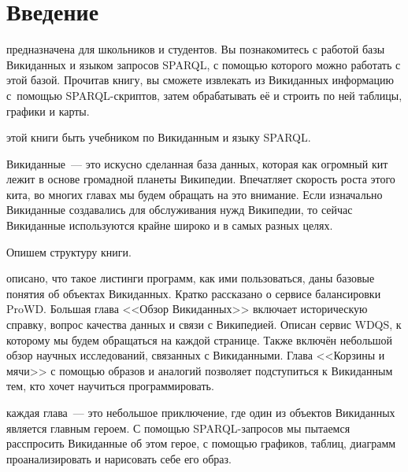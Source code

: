 \chapter*{Введение}
\label{ch:intro}

 предназначена для школьников и студентов. 
Вы познакомитесь с работой базы Викиданных и языком запросов SPARQL, 
с помощью которого можно работать с этой базой. 
Прочитав книгу, вы сможете извлекать из Викиданных информацию с~помощью SPARQL-скриптов, 
затем обрабатывать её и строить по ней таблицы, графики и карты.

 этой книги быть учебником по Викиданным и языку SPARQL.

\vspace{4mm}

Викиданные~--- это искусно сделанная база данных, которая как огромный кит лежит в основе громадной планеты Википедии. 
Впечатляет скорость роста этого кита, во многих главах мы будем обращать на это внимание.
Если изначально Викиданные создавались для обслуживания нужд Википедии, 
то сейчас Викиданные используются крайне широко и в самых разных целях.

\vspace{4mm}
Опишем структуру книги. 

 описано, 
что такое листинги программ, как ими пользоваться, даны базовые понятия об объектах Викиданных. 
Кратко рассказано о сервисе балансировки ProWD. 
Большая глава <<Обзор Викиданных>> включает историческую справку, 
вопрос качества данных и связи с Википедией. 
Описан сервис WDQS, к которому мы будем обращаться на каждой странице. 
Также включён небольшой обзор научных исследований, связанных с Викиданными. 
Глава <<Корзины и мячи>> с помощью образов и аналогий позволяет подступиться к Викиданным тем, 
кто хочет научиться программировать. 


каждая глава~--- это небольшое приключение, 
где один из объектов Викиданных является главным героем. 
С помощью SPARQL-запросов мы пытаемся расспросить Викиданные об этом герое, 
с помощью графиков, таблиц, диаграмм проанализировать и нарисовать себе его образ. 


